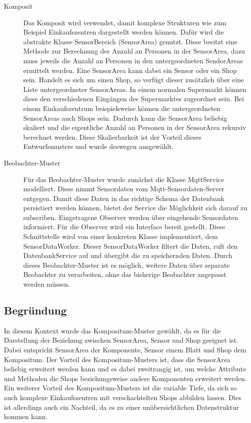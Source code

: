 \documentclass[runningheads]{llncs}
\begin{document}
\begin{description}
\item[Komposit]
Das Komposit wird verwendet, damit komplexe Strukturen wie zum Beispiel Einkaufszentren dargestellt werden können.
Dafür wird die abstrakte Klasse SensorBereich (SensorArea) genutzt. Diese besitzt eine Methode zur Berechnung der Anzahl an Personen in der SensorArea, dazu muss jeweils die Anzahl an Personen in den untergeordneten SendorAreas ermittelt werden.
Eine SensorArea kann dabei ein Sensor oder ein Shop sein.
Handelt es sich um einen Shop, so verfügt dieser zusätzlich über eine Liste untergeordneter SensorAreas.
In einem normalen Supermarkt können diese den verschiedenen Eingängen des Supermarktes zugeordnet sein.
Bei einem Einkaufszentrum beispielsweise können die untergeordneten SensorAreas auch Shops sein.
Dadurch kann die SensorArea beliebig skaliert und die eigentliche Anzahl an Personen in der SensorArea rekursiv berechnet werden.  
Diese Skalierbarkeit ist der Vorteil dieses Entwurfsmusters und wurde deswegen ausgewählt. 
\item[Beobachter-Muster]
Für das Beobachter-Muster wurde zunächst die Klasse MqttService modelliert. 
Diese nimmt Sensordaten vom Mqtt-Sensordaten-Server entgegen.
Damit diese Daten in das richtige Schema der Datenbank persistiert werden können, bietet der Service die Möglichkeit sich darauf zu subscriben.
Eingetragene Observer werden über eingehende Sensordaten informiert.
Für die Observer wird ein Interface bereit gestellt.
Diese Schnittstelle wird von einer konkreten Klasse implementiert, dem SensorDataWorker.
Dieser SensorDataWorker filtert die Daten, ruft den DatenbankService auf und übergibt die zu speichernden Daten.
Durch dieses Beobachter-Muster ist es möglich, weitere Daten über separate Beobachter zu verarbeiten, ohne das bisherige Beobachter angepasst werden müssen.
\end{description}


\subsection{Begründung}
In diesem Kontext wurde das Kompositum-Muster gewählt, da es für die Darstellung der Beziehung zwischen SensorArea, Sensor und Shop geeignet ist.
Dabei entspricht SensorArea der Komponente, Sensor einem Blatt und Shop dem Kompositum.
Der Vorteil des Kompositum-Musters ist, dass die SensorArea beliebig erweitert werden kann und es dabei zweitrangig ist, um welche Attribute und Methoden die Shops beziehungsweise andere Komponenten erweitert werden. 
Ein weiterer Vorteil des Kompositum-Musters ist die variable Tiefe, da sich so auch komplexe Einkaufszentren mit verschachtelten Shops abbilden lassen.
Dies ist allerdings auch ein Nachteil, da es zu einer unübersichtlichen Datenstruktur kommen kann.
\end{document}
